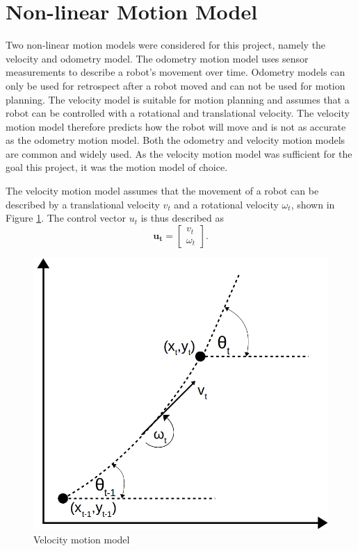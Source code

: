 \documentclass[12pt,oneside,openany,a4paper, %
afrikaans,english,
]{memoir}
\numberwithin{equation}{chapter}
\begin{document}
\section{Non-linear Motion Model}
Two non-linear motion models were considered for this project, namely the velocity and odometry model. The odometry motion model uses sensor measurements to describe a robot's movement over time. Odometry models can  only be used for retrospect after a robot moved and can not be used for motion planning. The velocity model is suitable for motion planning and assumes that a robot can be controlled with a rotational and translational velocity. The velocity motion model therefore predicts how the robot will move and is not as accurate as the odometry motion model. Both the odometry and velocity motion models are common and widely used. As the velocity motion model was sufficient for the goal this project, it was the motion model of choice.

The velocity motion model assumes that the movement of a robot can be described by a translational velocity $v_t$ and a rotational velocity $\omega_t$, shown in Figure \ref{fig:vel_model}. The control vector $u_t$ is thus described as
\begin{equation}
\bm{u_t} = 
\begin{bmatrix}
v_t\\
\omega_t
\end{bmatrix}.
\end{equation}
\begin{figure}
  \includegraphics[width=0.4\linewidth]{Figures/velocity_model.png}
  \centering
  \caption{Velocity motion model}
  \label{fig:vel_model}
\end{figure}
\end{document}
